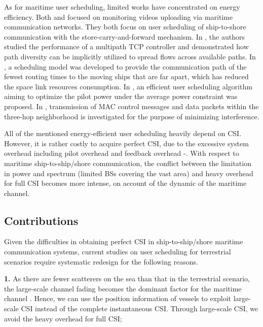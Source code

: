 \documentclass[conference]{IEEEtran}
\begin{document}
 As for maritime user scheduling, limited works have concentrated on energy efficiency. Both \cite{p300} and \cite{p301} focused on monitoring videos uploading via maritime communication networks. They both focus on user scheduling of ship-to-shore communication with the store-carry-and-forward mechanism.
 In \cite{p302}, the authors studied the performance of a multipath TCP controller and demonstrated how path diversity can be implicitly utilized to spread flows across available paths. 
 In \cite{p303}, a scheduling model was developed to provide the communication path of the fewest routing times to the moving ships that are far apart, which has reduced the space link resources consumption. 
 In \cite{p400}, an efficient user scheduling algorithm aiming to optimize the pilot power under the average power constraint was proposed. 
 In \cite{p402}, transmission of MAC control messages and data packets within the three-hop neighborhood is investigated for the purpose of minimizing interference. 
 
 All of the mentioned energy-efficient user scheduling heavily depend on CSI. However, it is rather costly to acquire perfect CSI, due to the excessive system overhead including pilot overhead and feedback overhead \cite{p403}-\cite{p405}. 
 With respect to maritime ship-to-ship/shore communication, the conflict between the limitation in power and spectrum (limited BSs covering the vast area) and heavy overhead for full CSI becomes more intense, on account of the dynamic of the maritime channel.
 
 \subsection{Contributions}
 
 Given the difficulties in obtaining perfect CSI in ship-to-ship/shore maritime communication systems, current studies on user scheduling for terrestrial scenarios require systematic redesign for the following reasons. 
 
 \textbf{1.} As there are fewer scatterers on the sea than that in the terrestrial scenario, the large-scale channel fading becomes the dominant factor for the maritime channel \cite{p403}. Hence, we can use the position information of vessels to exploit large-scale CSI instead of the complete instantaneous CSI. Through large-scale CSI, we avoid the heavy overhead for full CSI; 
 
\end{document}

